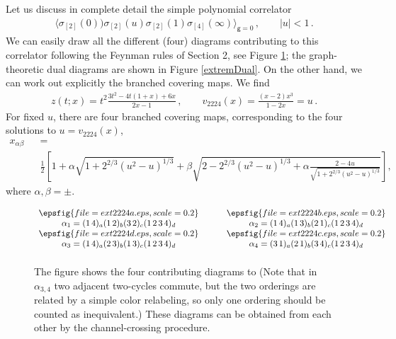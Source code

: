\documentclass[letterpaper]{JHEP3}
\def\s{\sigma}
\def\a{\alpha}
\def\half{{\frac12}}
\def\be{\begin{equation}}
\def\ee{\end{equation}}
\def\a{\alpha}
\def\be{\begin{eqnarray}}
\def\ee{\end{eqnarray}}
\def\gg{\mathsf g }
\begin{document}
Let us discuss  in complete detail the simple
polynomial correlator
\be
\langle\s_{[2]}(0) )\s_{[2]}(u)\s_{[2]}(1)\s_{[4]}(\infty)\rangle_{\gg=0} \, , \qquad |u| < 1 \,.
\ee 
We can easily draw all the different (four) diagrams contributing to this correlator following the Feynman rules of Section 2,
see  Figure \ref{extrem1}; the graph-theoretic dual diagrams are shown in Figure \ref{extremDual}. On the other hand,
we can work out explicitly the branched covering maps. We find
\be\label{2224ex}
 z(t; x) = t^2\frac{3t^2-4t(1+x)+6x}{2x-1} \, , \qquad v_{2224}(x)=\frac{(x-2)x^3}{1-2x} = u \,.
\ee 
For fixed $u$, there are four branched covering maps, corresponding to the four solutions
 to $u=v_{2224}(x)$,
\be\label{sols2224}
x_{\alpha\beta}&&=\\&&\half\left[1+\alpha\sqrt{1+2^{2/3}(u^2-u)^{1/3}}+\beta\sqrt{2-2^{2/3}(u^2-u)^{1/3}
+\alpha\frac{2-4u}{\sqrt{1+2^{2/3}(u^2-u)^{1/3}}}}\right],\nonumber
\ee where $\alpha,\beta=\pm$.
\begin{figure}[htbp]
\begin{center}
$\begin{array}{c@{\hspace{0.45in}}c}
 \epsfig{file=ext2224a.eps,scale=0.2} & \epsfig{file=ext2224b.eps,scale=0.2}\\
\a_1=(1\,4)_a(1\,2)_b(3\,2)_c (1\,2\,3\,4)_d&
\a_2=(1\,4)_a(1\,3)_b(2\,1)_c(1\,2\,3\,4)_d \\
  \epsfig{file=ext2224d.eps,scale=0.2} &  \epsfig{file=ext2224c.eps,scale=0.2} \\
\a_3=(1\,4)_a(2\,3)_b(1\,3)_c(1\,2\,3\,4)_d&
\a_4=(3\,1)_a(2\,1)_b(3\,4)_c(1\,2\,3\,4)_d
\\ [0.2cm]
\end{array}$
\end{center}
 \begin{center}
\caption{
The figure shows the four contributing diagrams to 
(Note that in $\a_{3,4}$ two adjacent two-cycles
commute, but the two orderings are related by a simple color relabeling, so only one ordering should be counted as inequivalent.)
 These diagrams can be obtained from each other
by the channel-crossing procedure. 
} \label{extrem1}
\end{center}
\end{figure}
\end{document}
